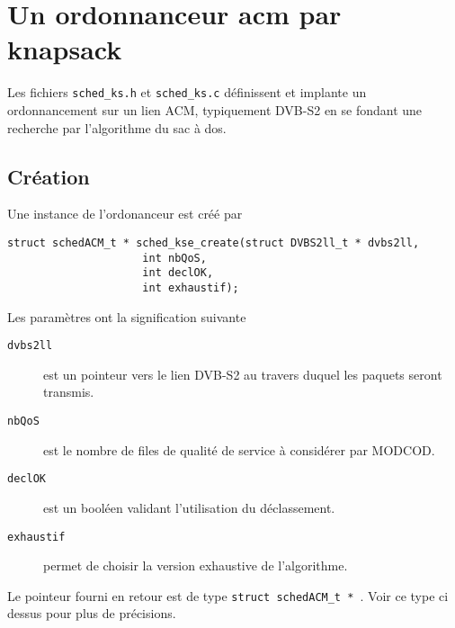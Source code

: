 
%
\section{Un ordonnanceur {\sc acm} par knapsack}

   Les fichiers {\tt sched\_ks.h} et {\tt sched\_ks.c} définissent et
implante un ordonnancement sur un lien ACM, typiquement DVB-S2 en se
fondant une recherche par l'algorithme du sac à dos.

%
\subsection{Création}

   Une instance de l'ordonanceur est créé par 

\begin{verbatim}
struct schedACM_t * sched_kse_create(struct DVBS2ll_t * dvbs2ll,
				     int nbQoS,
				     int declOK,
				     int exhaustif);
\end{verbatim}

   Les paramètres ont la signification suivante

\begin{description}
   \item[{\tt dvbs2ll}] est un pointeur vers le lien  DVB-S2 au
     travers duquel les paquets seront transmis.
   \item[{\tt nbQoS}] est le nombre de files de qualité de service à
     considérer par MODCOD.
   \item[{\tt declOK}] est un booléen validant l'utilisation du déclassement.
   \item[{\tt exhaustif}] permet de choisir la version exhaustive de
     l'algorithme. 
\end{description}

   Le pointeur fourni en retour est de type {\tt struct schedACM\_t *
   }. Voir ce type ci dessus pour plus de précisions.

